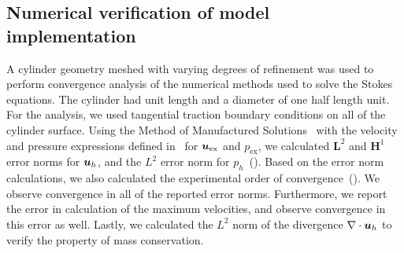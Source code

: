 \documentclass{WileyMSP-template}
\begin{document}
\subsection{Numerical verification of model implementation}\label{subsec:numerical_verification}
A cylinder geometry meshed with varying degrees of refinement was used to
perform convergence analysis of the numerical methods used to solve the Stokes equations.
The cylinder had unit length and a diameter of one half length unit.
For the analysis, we used tangential traction boundary conditions on all
of the cylinder surface. Using the Method of Manufactured Solutions~\cite{Roache2001CodeSolutions}
with the velocity and pressure expressions defined in~
for $\bm{u}_{\mathrm{ex}}$ and $p_{\mathrm{ex}}$, we calculated $\mathbf{L}^2$
and $\mathbf{H}^1$ error norms for $\bm{u}_h$, and the $L^2$ error norm for
$p_h$~(). Based on the error norm calculations,
we also calculated the experimental order of convergence~().
We observe convergence in all of the reported error norms. Furthermore,
we report the error in calculation of the maximum velocities, and observe
convergence in this error as well. Lastly, we calculated the $L^2$ norm of
the divergence $\nabla\cdot\bm{u}_h$ to verify the property of mass conservation.
\end{document}
